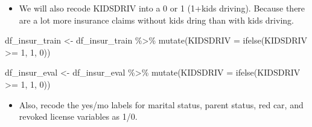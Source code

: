 \documentclass[
]{article}
\newenvironment{Shaded}{\begin{snugshade}}{\end{snugshade}}
\newcommand{\AttributeTok}[1]{\textcolor[rgb]{0.77,0.63,0.00}{#1}}
\newcommand{\DecValTok}[1]{\textcolor[rgb]{0.00,0.00,0.81}{#1}}
\newcommand{\FunctionTok}[1]{\textcolor[rgb]{0.00,0.00,0.00}{#1}}
\newcommand{\NormalTok}[1]{#1}
\newcommand{\OtherTok}[1]{\textcolor[rgb]{0.56,0.35,0.01}{#1}}
\newcommand{\SpecialCharTok}[1]{\textcolor[rgb]{0.00,0.00,0.00}{#1}}
\providecommand{\tightlist}{%
  \setlength{\itemsep}{0pt}\setlength{\parskip}{0pt}}
\begin{document}
\begin{itemize}
\tightlist
\item
  We will also recode KIDSDRIV into a 0 or 1 (1+kids driving). Because
  there are a lot more insurance claims without kids dring than with
  kids driving.
\end{itemize}

\begin{Shaded}
\begin{Highlighting}[]
\NormalTok{df\_insur\_train }\OtherTok{\textless{}{-}}\NormalTok{ df\_insur\_train }\SpecialCharTok{\%\textgreater{}\%} 
  \FunctionTok{mutate}\NormalTok{(}\AttributeTok{KIDSDRIV =} \FunctionTok{ifelse}\NormalTok{(KIDSDRIV }\SpecialCharTok{\textgreater{}=} \DecValTok{1}\NormalTok{, }\DecValTok{1}\NormalTok{, }\DecValTok{0}\NormalTok{))}

\NormalTok{df\_insur\_eval }\OtherTok{\textless{}{-}}\NormalTok{ df\_insur\_eval }\SpecialCharTok{\%\textgreater{}\%} 
  \FunctionTok{mutate}\NormalTok{(}\AttributeTok{KIDSDRIV =} \FunctionTok{ifelse}\NormalTok{(KIDSDRIV }\SpecialCharTok{\textgreater{}=} \DecValTok{1}\NormalTok{, }\DecValTok{1}\NormalTok{, }\DecValTok{0}\NormalTok{))}
\end{Highlighting}
\end{Shaded}

\begin{itemize}
\tightlist
\item
  Also, recode the yes/mo labels for marital status, parent status, red
  car, and revoked license variables as 1/0.
\end{itemize}
\end{document}
